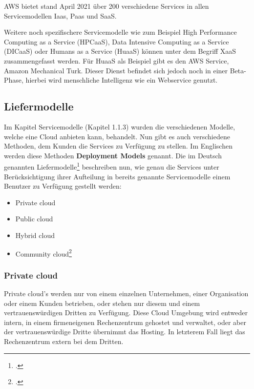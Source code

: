 AWS bietet stand April 2021 über 200 verschiedene Services in allen Servicemodellen Iaas, Paas und SaaS.

Weitere noch spezifischere Servicemodelle wie zum Beispiel High Performance Computing as a Service (HPCaaS), Data Intensive Computing as a Service (DICaaS) oder Humans as a Service (HuaaS) können unter dem Begriff XaaS zusammengefasst werden.
Für HuaaS als Beispiel gibt es den AWS Service, Amazon Mechanical Turk.
Dieser Dienst befindet sich jedoch noch in einer Beta-Phase, hierbei wird menschliche Intelligenz wie ein Webservice genutzt.

\subsection{Liefermodelle}
Im Kapitel Servicemodelle (Kapitel 1.1.3) wurden die verschiedenen Modelle, welche eine Cloud anbieten kann, behandelt. Nun gibt es auch verschiedene Methoden, dem Kunden die Services zu Verfügung zu stellen.
Im Englischen werden diese Methoden \textbf{Deployment Models} genannt.
Die im Deutsch genannten Liefermodelle\footcite{Lehrunterlagen-HTL-cloud} beschreiben nun, wie genau die Services unter Berücksichtigung ihrer Aufteilung in bereits genannte Servicemodelle einem Benutzer zu Verfügung gestellt werden:
\begin{itemize}
	\item Private cloud
	\item Public cloud
	\item Hybrid cloud
	\item Community cloud\footcite{cloud-types-pic}
\end{itemize}
\subsubsection{Private cloud}
Private cloud's werden nur von einem einzelnen Unternehmen, einer Organisation oder einem Kunden betrieben, oder stehen nur diesem und einem vertrauenswürdigen Dritten zu Verfügung.
Diese Cloud Umgebung wird entweder intern, in einem firmeneigenen Rechenzentrum gehostet und verwaltet, oder aber der vertrauenswürdige Dritte übernimmt das Hosting. In letzterem Fall liegt das Rechenzentrum extern bei dem Dritten.

